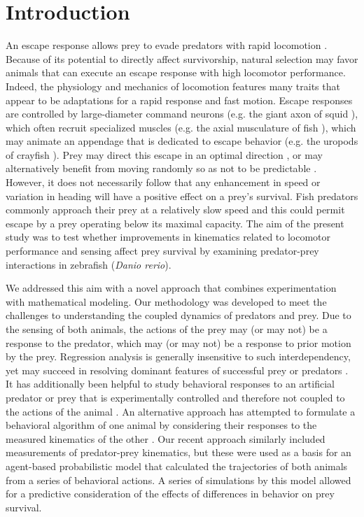 \documentclass[]{rsos}%
\begin{document}
\section{Introduction}
An escape response allows prey to evade predators with rapid locomotion \cite{Bullock:1984gd}.
Because of its potential to directly affect survivorship, natural selection may favor animals that can execute an escape response with high locomotor performance.
Indeed, the physiology and mechanics of locomotion features many traits that appear to be adaptations for a rapid response and fast motion.
Escape responses are controlled by large-diameter command neurons (e.g. the giant axon of squid \cite{YOUNG:1938vi}), which often recruit specialized muscles (e.g. the axial musculature of fish \cite{Eaton:1975ux}), which may animate an appendage that is dedicated to escape behavior (e.g. the uropods of crayfish \cite{Johnson:1926cl}).
Prey may direct this escape in an optimal direction \cite{Weihs:1984tb}, or may alternatively benefit from moving randomly so as not to be predictable \cite{Humphries:1970hy,Howland:1974ud}.
However, it does not necessarily follow that any enhancement in speed or variation in heading will have a positive effect on a prey's survival.
Fish predators commonly approach their prey at a relatively slow speed \cite{Webb:1984jz,Higham:2007go} and this could permit escape by a prey operating below its maximal capacity. 
The aim of the present study was to test whether improvements in kinematics related to locomotor performance and sensing affect prey survival by examining predator-prey interactions in zebrafish (\textit{Danio rerio}).

We addressed this aim with a novel approach that combines experimentation with mathematical modeling.
Our methodology was developed to meet the challenges to understanding the coupled dynamics of predators and prey.
Due to the sensing of both animals, the actions of the prey may (or may not) be a response to the predator, which may (or may not) be a response to prior motion by the prey. 
Regression analysis is generally insensitive to such interdependency, yet may succeed in resolving dominant features of successful prey \cite{Walker:2005vn} or predators \cite{Wainwright:2001ufa}.
It has additionally been helpful to study behavioral responses to an artificial predator or prey that is experimentally controlled and therefore not coupled to the actions of the animal \cite{Gabbiani:1999wz,Stewart:2014cma,Heuch:2007kk,Wainwright:2001ufa,Shifferman:2004fs}.
An alternative approach has attempted to formulate a behavioral algorithm of one animal by considering their responses to the measured kinematics of the other \cite{Ghose:2006dk}. 
Our recent approach similarly included measurements of predator-prey kinematics, but these were used as a basis for an agent-based probabilistic model that calculated the trajectories of both animals from a series of behavioral actions. 
A series of simulations by this model allowed for a predictive consideration of the effects of differences in behavior on prey survival.
\end{document}
